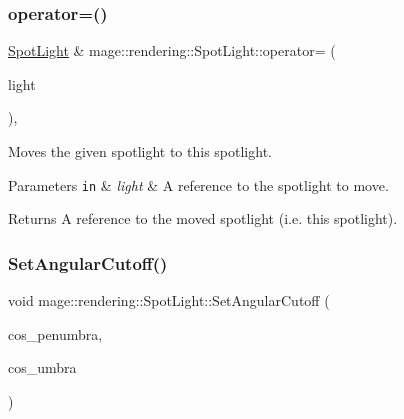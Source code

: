 \subsubsection{\texorpdfstring{operator=()}{operator=()}\hspace{0.1cm}{\footnotesize\ttfamily [2/2]}}
{\footnotesize\ttfamily \mbox{\hyperlink{classmage_1_1rendering_1_1_spot_light}{Spot\+Light}} \& mage\+::rendering\+::\+Spot\+Light\+::operator= (\begin{DoxyParamCaption}\item[{\mbox{\hyperlink{classmage_1_1rendering_1_1_spot_light}{Spot\+Light}} \&\&}]{light }\end{DoxyParamCaption})\hspace{0.3cm}{\ttfamily [default]}, {\ttfamily [noexcept]}}

Moves the given spotlight to this spotlight.


\begin{DoxyParams}[1]{Parameters}
\mbox{\tt in}  & {\em light} & A reference to the spotlight to move. \\
\hline
\end{DoxyParams}
\begin{DoxyReturn}{Returns}
A reference to the moved spotlight (i.\+e. this spotlight). 
\end{DoxyReturn}
\mbox{\label{classmage_1_1rendering_1_1_spot_light_a92a3b92e8a789c038c0f9058b1ff5a48}} 
\subsubsection{\texorpdfstring{Set\+Angular\+Cutoff()}{SetAngularCutoff()}}
{\footnotesize\ttfamily void mage\+::rendering\+::\+Spot\+Light\+::\+Set\+Angular\+Cutoff (\begin{DoxyParamCaption}\item[{\mbox{\hyperlink{namespacemage_aa97e833b45f06d60a0a9c4fc22ae02c0}{F32}}}]{cos\+\_\+penumbra,  }\item[{\mbox{\hyperlink{namespacemage_aa97e833b45f06d60a0a9c4fc22ae02c0}{F32}}}]{cos\+\_\+umbra }\end{DoxyParamCaption})\hspace{0.3cm}{\ttfamily [noexcept]}}


